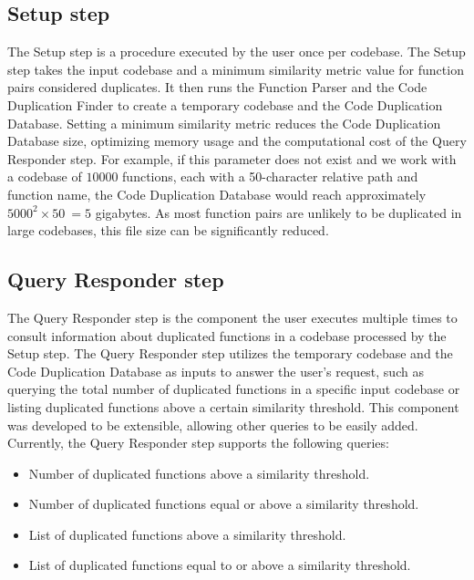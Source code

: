 \subsection{Setup step}
\label{subsec:setup}

The Setup step is a procedure executed by the user once per codebase. The Setup step takes the input codebase and a minimum similarity metric value for function pairs considered duplicates. It then runs the Function Parser and the Code Duplication Finder to create a temporary codebase and the Code Duplication Database. Setting a minimum similarity metric reduces the Code Duplication Database size, optimizing memory usage and the computational cost of the Query Responder step. For example, if this parameter does not exist and we work with a codebase of $10000$ functions, each with a 50-character relative path and function name, the Code Duplication Database would reach approximately $5000^2 \times 50 ~= 5$ gigabytes. As most function pairs are unlikely to be duplicated in large codebases, this file size can be significantly reduced.

\subsection{Query Responder step}

The Query Responder step is the component the user executes multiple times to consult information about duplicated functions in a codebase processed by the Setup step. The Query Responder step utilizes the temporary codebase and the Code Duplication Database as inputs to answer the user's request, such as querying the total number of duplicated functions in a specific input codebase or listing duplicated functions above a certain similarity threshold. This component was developed to be extensible, allowing other queries to be easily added. Currently, the Query Responder step supports the following queries:

\begin{itemize}
	\item Number of duplicated functions above a similarity threshold.
	\item Number of duplicated functions equal or above a similarity threshold.
	\item List of duplicated functions above a similarity threshold.
	\item List of duplicated functions equal to or above a similarity threshold.
\end{itemize}
